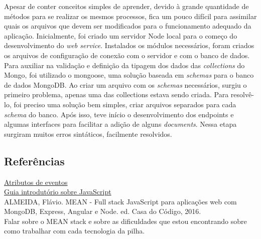 \documentclass[
	12pt,				%
	oneside,			%
	a4paper,			%
	brazil				%
]{abntex2}
\begin{document}
Apesar de conter conceitos simples de aprender, devido à grande quantidade de métodos para se realizar os mesmos processos, fica um pouco difícil para assimilar quais os arquivos que devem ser modificados para o funcionamento adequado da aplicação.
Inicialmente, foi criado um servidor Node local para o começo do desenvolvimento do \textit{web service}.
Instalados os módulos necessários, foram criados os arquivos de configuração de conexão com o servidor e com o banco de dados.
Para auxiliar na validação e definição da tipagem dos dados das \textit{collections} do Mongo, foi utilizado o mongoose, uma solução baseada em \textit{schemas} para o banco de dados MongoDB. Ao criar um arquivo com os \textit{schemas} necessários, surgiu o primeiro problema, apenas uma das collections estava sendo criada. 
Para resolvê-lo, foi preciso uma solução bem simples, criar arquivos separados para cada \textit{schema} do banco.
Após isso, teve início o desenvolvimento dos endpoints e algumas interfaces para facilitar a adição de alguns \textit{documents}. Nessa etapa surgiram muitos erros sintáticos, facilmente resolvidos.

\subsection{Referências}

\href{https://www.w3schools.com/tags/ref_eventattributes.asp}{Atributos de eventos}\\
\href{http://tableless.github.io/iniciantes/manual/js/}{Guia introdutório sobre JavaScript}\\

ALMEIDA, Flávio. MEAN - Full stack JavaScript para aplicações web com MongoDB, Express, Angular e Node. ed. Casa do Código, 2016.\\

Falar sobre o MEAN stack e sobre as dificuldades que estou encontrando sobre como trabalhar com cada tecnologia da pilha.
\end{document}
